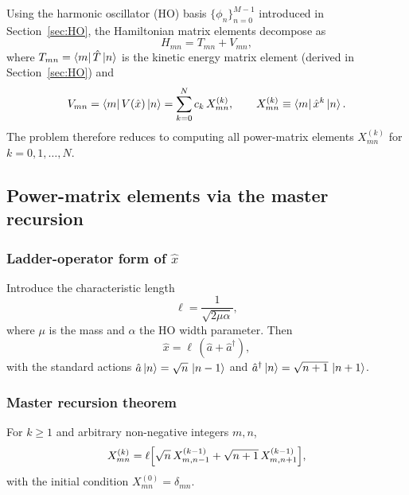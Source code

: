 Using the harmonic oscillator (HO) basis $\{\phi_n\}_{n=0}^{M-1}$ introduced
in Section~\ref{sec:HO}, the Hamiltonian matrix elements decompose as
\begin{equation}\label{eq:gen_H_elem}
  H_{mn} = T_{mn} + V_{mn},
\end{equation}
where $T_{mn}=\bra{m}\hat T\ket{n}$ is the kinetic energy matrix element
(derived in Section~\ref{sec:HO}) and
\begin{equation}\label{eq:gen_V_elem}
  V_{mn} = \bra{m}V(\hat x)\ket{n}
         = \sum_{k=0}^{N} c_k\, X^{(k)}_{mn},
  \qquad
  X^{(k)}_{mn} \equiv \bra{m}\hat x^k\ket{n}.
\end{equation}
The problem therefore reduces to computing all power-matrix elements
$X^{(k)}_{mn}$ for $k=0,1,\ldots,N$.

\subsection{Power-matrix elements via the master recursion}\label{sec:master_rec}

\subsubsection{Ladder-operator form of \texorpdfstring{$\hat x$}{x}}

Introduce the characteristic length
\begin{equation}\label{eq:ell}
  \ell = \frac{1}{\sqrt{2\mu\alpha}},
\end{equation}
where $\mu$ is the mass and $\alpha$ the HO width parameter.  Then
\begin{equation}\label{eq:x_ladder}
  \hat x = \ell\,(\hat a + \hat a^\dagger),
\end{equation}
with the standard actions $\hat a\ket{n}=\sqrt{n}\,\ket{n-1}$ and
$\hat a^\dagger\ket{n}=\sqrt{n+1}\,\ket{n+1}$.

\subsubsection{Master recursion theorem}

\begin{result}\label{res:master_rec}
  For $k \geq 1$ and arbitrary non-negative integers $m,n$,
  \begin{equation}\label{eq:master_rec}
    X^{(k)}_{mn}
    = \ell\Bigl[\sqrt{n}\,X^{(k-1)}_{m,n-1}
               + \sqrt{n+1}\,X^{(k-1)}_{m,n+1}\Bigr],
  \end{equation}
  with the initial condition $X^{(0)}_{mn} = \delta_{mn}$.
\end{result}

